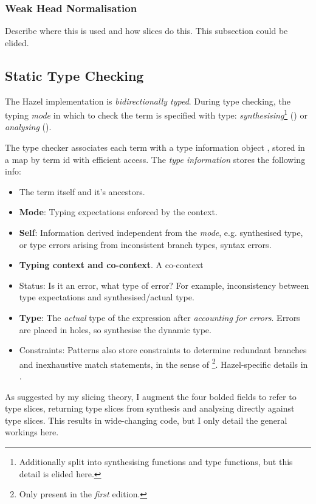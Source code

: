 \subsubsection{Weak Head Normalisation}
Describe where this is used and how slices do this. This subsection could be elided.

\subsection{Static Type Checking}\label{sec:TypeChecking}
The Hazel implementation is \textit{bidirectionally typed}. During type checking, the typing \textit{mode} in which to check the term is specified with  type: \textit{synthesising}\footnote{Additionally split into synthesising functions and type functions, but this detail is elided here.} () or \textit{analysing} ().

The type checker associates each term with a type information object , stored in a map by term id with efficient access. The \textit{type information} stores the following info:
\begin{itemize}
\item The term itself and it's ancestors.
\item \textbf{Mode}: Typing expectations enforced by the context.
\item \textbf{Self}: Information derived independent from the \textit{mode}, e.g. synthesised type, or type errors arising from inconsistent branch types, syntax errors.
\item \textbf{Typing context and co-context}. A co-context
\item Status: Is it an error, what type of error? For example, inconsistency between type expectations and synthesised/actual type.
\item \textbf{Type}: The \textit{actual} type of the expression after \textit{accounting for errors}. Errors are placed in holes, so synthesise the dynamic type. 
\item Constraints: Patterns also store constraints to determine redundant branches and inexhaustive match statements, in the sense of \cite[ch. 13]{PracticalFoundationsEd1}\footnote{Only present in the \textit{first} edition.}. Hazel-specific details in \cite{LivePatternMatching}.
\end{itemize}

As suggested by my slicing theory, I augment the four bolded fields to refer to type slices, returning type slices from synthesis and analysing directly against type slices. This results in wide-changing code, but I only detail the general workings here.

